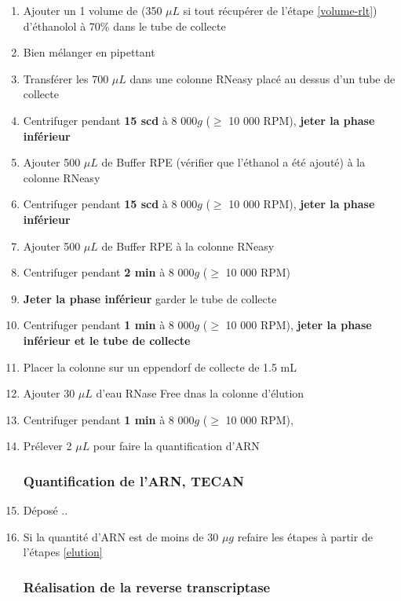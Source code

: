 \begin{enumerate}
\item Ajouter un 1 volume de (350 $\mu L$ si tout récupérer de l'étape \ref{volume-rlt}) d'éthanolol à 70\% dans le tube de collecte
\item Bien mélanger en pipettant
\item Transférer les 700 $\mu L$ dans une colonne RNeasy placé au dessus d'un tube de collecte
\item Centrifuger pendant \textbf{15 scd} à 8 000$g$ ($\geq$ 10 000 RPM), \textbf{jeter la phase inférieur}
\item Ajouter 500 $\mu L$ de Buffer RPE (vérifier que l'éthanol a été ajouté) à la colonne RNeasy
\item Centrifuger pendant \textbf{15 scd} à 8 000$g$ ($\geq$ 10 000 RPM), \textbf{jeter la phase inférieur}
\item Ajouter 500 $\mu L$ de Buffer RPE à la colonne RNeasy
\item Centrifuger pendant \textbf{2 min} à 8 000$g$ ($\geq$ 10 000 RPM)
\item \textbf{Jeter la phase inférieur} garder le tube de collecte
\item Centrifuger pendant \textbf{1 min} à 8 000$g$ ($\geq$ 10 000 RPM), \textbf{jeter la phase inférieur et le tube de collecte}
\item Placer la colonne sur un eppendorf de collecte de 1.5 mL \label{elution}
\item Ajouter 30 $\mu L$ d'eau RNase Free dnas la colonne d'élution 
\item Centrifuger pendant \textbf{1 min} à 8 000$g$ ($\geq$ 10 000 RPM), \textbf{\color{red}{pour éluer l'ARN dans l'eppendorf de collecte}}
\item Prélever 2 $\mu L$ pour faire la quantification d'ARN


\subsubsection{Quantification de l'ARN, TECAN}

\item Déposé ..




\item Si la quantité d'ARN est de moins de 30 $\mu g$ refaire les étapes à partir de l'étapes \ref{elution}

\subsubsection{Réalisation de la reverse transcriptase}


\end{enumerate}